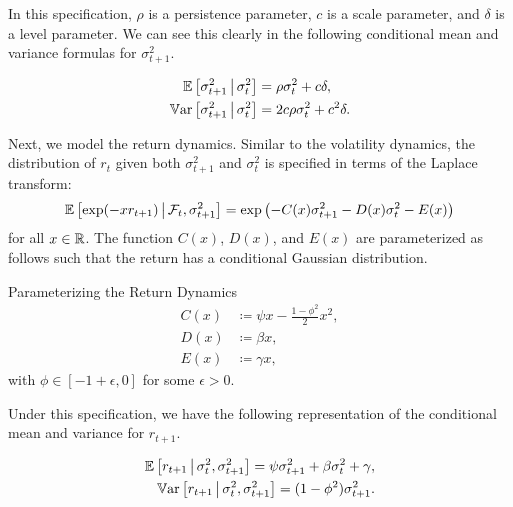 In this specification, $\rho$ is a persistence parameter, $c$ is a scale parameter, and $\delta$ is a level parameter. We can see this clearly in the following conditional mean and variance formulas for $\sigma^2_{t+1}$.

\begin{remark} 
 \label{remark:vol_moment_conditions}
    \begin{align}
        \E\left[\sigma^2_{t+1} \mvert \sigma^2_t \right] &= \rho \sigma^2_t + c \delta,\\
%   
        \Var\left[\sigma^2_{t+1} \mvert \sigma^2_t \right] &= 2 c \rho \sigma^2_t + c^2 \delta.
%   
    \end{align}
\end{remark}

Next, we model the return dynamics. Similar to the volatility dynamics, the distribution of $r_t$ given both $\sigma^2_{t+1}$ and $\sigma^2_{t}$ is specified in terms of the Laplace transform:
%
\begin{equation}
    \label{eqn:return_laplace_transform}
    \operatorname{\mathbb{E}}\left[\exp(- x r_{t+1}) \,\middle\vert\, \mathcal{F}_{t}, \sigma^2_{t+1} \right] = \exp\left(- C(x) \sigma^2_{t+1} - D(x) \sigma^2_t - E(x)\right)
\end{equation}
%
for all $x \in \mathbb{R}$. The function $C(x)$, $D(x)$, and $E(x)$ are parameterized as follows such that the return has a conditional Gaussian distribution.

\begin{definition}{Parameterizing the Return Dynamics}
    \label{defn:physical_return_dynamics}
    \begin{align}
        C(x) &\coloneqq \psi x - \frac{1 - \phi^2}{2} x^2,\\
        D(x) &\coloneqq \beta x, \\
        E(x) &\coloneqq \gamma x,
    \end{align}
with $\phi \in [-1+\epsilon, 0]$ for some $\epsilon>0$.
\end{definition}

Under this specification, we have the following representation of the conditional mean and variance for $r_{t+1}$.

\begin{remark} 
	\label{remark:return_moment_conditions}
	\begin{align}
		\label{eqn:rtn_cond_mean}
		\operatorname{\mathbb{E}}\left[r_{t+1} \,\middle\vert\, \sigma^2_t, \sigma^2_{t+1}\right] = \psi \sigma^2_{t+1} + \beta \sigma^2_t + \gamma, \\
		\label{eqn:rtn_cond_vol}
		\operatorname{\mathbb{V}ar}\left[r_{t+1} \,\middle\vert\, \sigma^2_t, \sigma^2_{t+1}\right] = (1 - \phi^2) \sigma^2_{t+1}.
	\end{align}
\end{remark}



